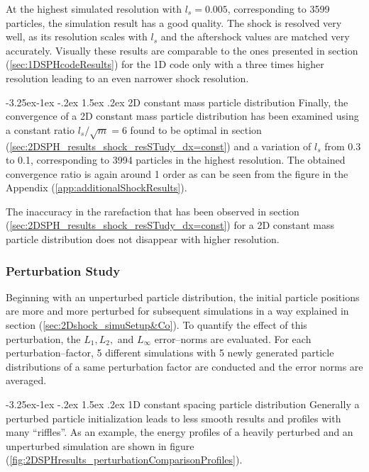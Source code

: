 \documentclass[11pt,a4paper,twoside]{report}
\makeatletter
\renewcommand\paragraph{\@startsection{paragraph}{4}{\z@}%
  {-3.25ex\@plus -1ex \@minus -.2ex}%
  {1.5ex \@plus .2ex}%
  {\normalfont\normalsize\bfseries}}
\makeatother
\begin{document}
At the highest simulated resolution with $l_s=0.005$, corresponding to 3599 particles, the simulation result has a good quality. The shock is resolved very well, as its resolution scales with $l_s$ and the aftershock values are matched very accurately. Visually these results are comparable to the ones presented in section (\ref{sec:1DSPHcodeResults}) for the 1D code only with a three times higher resolution leading to an even narrower shock resolution.

\paragraph{2D constant mass particle distribution}
Finally, the convergence of a 2D constant mass particle distribution has been examined using a constant ratio $l_s/\sqrt{m}=6$ found to be optimal in section (\ref{sec:2DSPH_results_shock_resSTudy_dx=const}) and a variation of $l_s$ from 0.3 to 0.1, corresponding to 3994 particles in the highest resolution.
The obtained convergence ratio is again around 1 order as can be seen from the figure in the Appendix (\ref{app:additionalShockResults}). 

The inaccuracy in the rarefaction that has been observed in section (\ref{sec:2DSPH_results_shock_resSTudy_dx=const}) for a 2D constant mass particle distribution does not disappear with higher resolution. 
 

\subsubsection{Perturbation Study}
Beginning with an unperturbed particle distribution, the initial particle positions are more and more perturbed for subsequent simulations in a way explained in section (\ref{sec:2Dshock_simuSetup&Co}). To quantify the effect of this perturbation, the $L_1, L_2,$ and $L_{\infty}$ error--norms are evaluated. For each perturbation--factor, 5 different simulations with 5 newly generated particle distributions of a same perturbation factor are conducted and the error norms are averaged.


\paragraph{1D constant spacing particle distribution}
Generally a perturbed particle initialization leads to less smooth results and profiles with many ``riffles''. As an example, the energy profiles of a heavily perturbed and an unperturbed simulation are shown in figure (\ref{fig:2DSPHresults_perturbationComparisonProfiles}).
\end{document}
